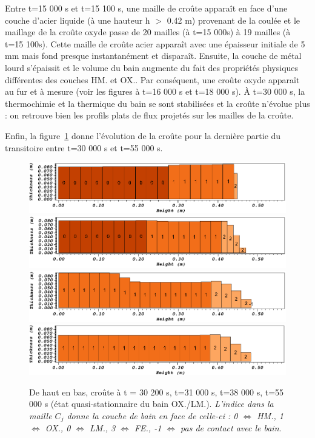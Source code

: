 Entre t=15 000 s et t=15 100 s, une maille de croûte apparaît en face d'une couche d'acier liquide (à une hauteur h $>$ 0.42 m) provenant de la coulée et le maillage de la croûte oxyde passe de 20 mailles (à t=15 000s) à 19 mailles (à t=15 100s). Cette maille de croûte acier apparaît avec une épaisseur initiale de 5 mm mais fond presque instantanément et disparaît. Ensuite, la couche de métal lourd s'épaissit et le volume du bain augmente du fait des propriétés physiques différentes des couches HM. et OX.. Par conséquent, une croûte oxyde apparaît au fur et à mesure (voir les figures à t=16 000 s et t=18 000 s). À t=30 000 s, la thermochimie et la thermique du bain se sont stabilisées et la croûte n'évolue plus : on retrouve bien les profils plats de flux projetés sur les mailles de la croûte.

Enfin, la figure~\ref{fig:croutes_3} donne l'évolution de la croûte pour la dernière partie du transitoire entre t=30 000 s et t=55 000 s.
\begin{figure}
\centering
\includegraphics[width=\textwidth, keepaspectratio=true]{Figures/croute_30200.png}\\
\includegraphics[width=\textwidth, keepaspectratio=true]{Figures/croute_31000.png}\\
\includegraphics[width=\textwidth, keepaspectratio=true]{Figures/croute_38000.png}\\
\includegraphics[width=\textwidth, keepaspectratio=true]{Figures/croute_55000.png}
\caption{De haut en bas, croûte à t = 30 200 s, t=31 000 s, t=38 000 s, t=55 000 s (état quasi-stationnaire du bain OX./LM.). \textit{L'indice dans la maille $C_j$ donne la couche de bain en face de celle-ci : 0 $\Leftrightarrow$ HM., 1 $\Leftrightarrow$ OX., 0 $\Leftrightarrow$ LM., 3 $\Leftrightarrow$ FE., -1 $\Leftrightarrow$ pas de contact avec le bain}.}
\label{fig:croutes_3}
\end{figure}
